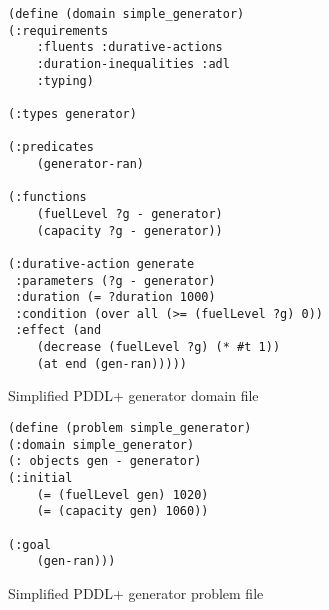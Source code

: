 \begin{figure}[thb]
\small
\begin{verbatim}
(define (domain simple_generator)
(:requirements
    :fluents :durative-actions
    :duration-inequalities :adl
    :typing)
    
(:types generator)

(:predicates 
    (generator-ran)
    
(:functions
    (fuelLevel ?g - generator)
    (capacity ?g - generator))

(:durative-action generate
 :parameters (?g - generator)
 :duration (= ?duration 1000)		 
 :condition (over all (>= (fuelLevel ?g) 0))
 :effect (and
    (decrease (fuelLevel ?g) (* #t 1))
    (at end (gen-ran)))))
\end{verbatim}
\caption{Simplified PDDL+ generator domain file}
\label{fig:domain file}
\end{figure}


\begin{figure}[thb]
\small
\begin{verbatim}
(define (problem simple_generator)
(:domain simple_generator)
(: objects gen - generator)
(:initial 
    (= (fuelLevel gen) 1020)
    (= (capacity gen) 1060))

(:goal
    (gen-ran)))
\end{verbatim}
\caption{Simplified PDDL+ generator problem file}
\label{fig:problem file}
\end{figure}

